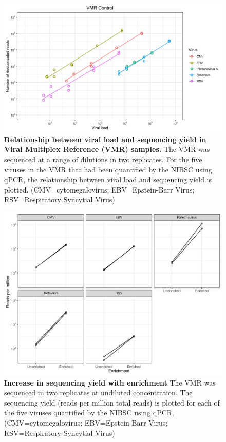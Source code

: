 \FloatBarrier
\begin{figure}[htbp]
\centering
\includegraphics[width=\textwidth]{./Results1/Images/vmr-1.png}
\caption[Viral Multiplex Reference ]{\textbf{Relationship between viral load and sequencing yield in Viral Multiplex Reference (VMR) samples.} The VMR was sequenced at a range of dilutions in two replicates. For the five viruses in the VMR that had been quantified by the NIBSC using qPCR, the relationship between viral load and sequencing yield is plotted. (CMV=cytomegalovirus; EBV=Epstein-Barr Virus; RSV=Respiratory Syncytial Virus)}
\label{fig:vmrconc}
\end{figure}
\FloatBarrier

 

\FloatBarrier
\begin{figure}[htbp]
\centering
\includegraphics[width=\textwidth]{./Results1/Images/vmr-enrichment.pdf}
\caption[Viral Multiplex Reference Enrichment]{\textbf{Increase in sequencing yield with enrichment} The VMR was sequenced in two replicates at undiluted concentration. The sequencing yield (reads per million total reads) is plotted for each of the five viruses quantified by the NIBSC using qPCR. (CMV=cytomegalovirus; EBV=Epstein-Barr Virus; RSV=Respiratory Syncytial Virus)}
\label{fig:vmrenrich}
\end{figure}
\FloatBarrier

